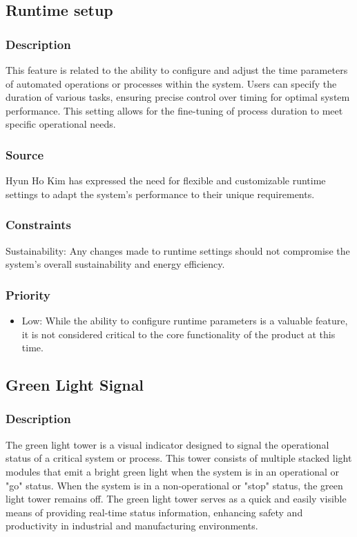 \subsection{Runtime setup}
\subsubsection{Description}
This feature is related to the ability to configure and adjust the time parameters of automated operations or processes within the system. Users can specify the duration of various tasks, ensuring precise control over timing for optimal system performance. This setting allows for the fine-tuning of process duration to meet specific operational needs.
\subsubsection{Source}
Hyun Ho Kim has expressed the need for flexible and customizable runtime settings to adapt the system's performance to their unique requirements. 
\subsubsection{Constraints}
Sustainability: Any changes made to runtime settings should not compromise the system's overall sustainability and energy efficiency.
\subsubsection{Priority}
\begin{itemize}
\item Low:
While the ability to configure runtime parameters is a valuable feature, it is not considered critical to the core functionality of the product at this time.
\end{itemize}
\subsection{Green Light Signal}
\subsubsection{Description}
The green light tower is a visual indicator designed to signal the operational status of a critical system or process. This tower consists of multiple stacked light modules that emit a bright green light when the system is in an operational or "go" status. When the system is in a non-operational or "stop" status, the green light tower remains off. The green light tower serves as a quick and easily visible means of providing real-time status information, enhancing safety and productivity in industrial and manufacturing environments.
